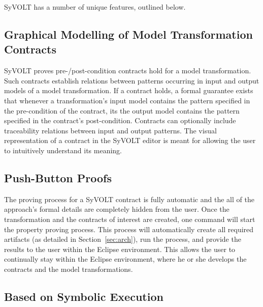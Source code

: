 SyVOLT has a number of unique features, outlined below.

\subsection{Graphical Modelling of Model Transformation Contracts}

SyVOLT proves pre-/post-condition contracts hold for a model transformation.
Such contracts establish relations between patterns occurring in input and output
models of a model transformation. If a contract holds, a formal guarantee
exists that whenever a transformation's input model contains the pattern
specified in the pre-condition of the contract, its the output model contains
the pattern specified in the contract's post-condition. Contracts can 
optionally include traceability relations between input and output patterns. The
visual representation of a contract in the SyVOLT editor is meant for allowing
the user to intuitively understand its meaning.


\subsection{Push-Button Proofs}
\label{sec:push_button_proofs}
The proving process for a SyVOLT contract is fully automatic and the all of the
approach's formal details are completely hidden from the user. Once the
transformation and the contracts of interest are created, one command will start
the property proving process. This process will automatically create all
required artifacts (as detailed in Section~\ref{sec:arch}), run the process, and
provide the results to the user within the Eclipse environment. This allows the user to continually stay within the
Eclipse environment, where he or she develops the contracts and the
model transformations.




\subsection{Based on Symbolic Execution}

